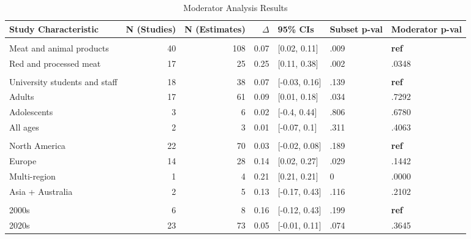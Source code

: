 \documentclass[sn-nature,referee,pdflatex]{sn-jnl}
\begin{document}
\begin{table}[!h]
\centering
\caption{\label{tab:table_two}Moderator Analysis Results}
\centering
\begin{tabular}[t]{lrrrlll}
\toprule
Study Characteristic & N (Studies) & N (Estimates) & $\Delta$ & 95\% CIs & Subset p-val & Moderator p-val\\
\midrule
\addlinespace[0.3em]
\multicolumn{7}{l}{\textbf{Outcome}}\\
\hspace{1em}Meat and animal products & 40 & 108 & 0.07 & {}[0.02, 0.11] & .009 & \textbf{ref}\\
\hspace{1em}Red and processed meat & 17 & 25 & 0.25 & {}[0.11, 0.38] & .002 & .0348\\
\addlinespace[0.3em]
\multicolumn{7}{l}{\textbf{Population}}\\
\hspace{1em}University students and staff & 18 & 38 & 0.07 & {}[-0.03, 0.16] & .139 & \textbf{ref}\\
\hspace{1em}Adults & 17 & 61 & 0.09 & {}[0.01, 0.18] & .034 & .7292\\
\hspace{1em}Adolescents & 3 & 6 & 0.02 & {}[-0.4, 0.44] & .806 & .6780\\
\hspace{1em}All ages & 2 & 3 & 0.01 & {}[-0.07, 0.1] & .311 & .4063\\
\addlinespace[0.3em]
\multicolumn{7}{l}{\textbf{Region}}\\
\hspace{1em}North America & 22 & 70 & 0.03 & {}[-0.02, 0.08] & .189 & \textbf{ref}\\
\hspace{1em}Europe & 14 & 28 & 0.14 & {}[0.02, 0.27] & .029 & .1442\\
\hspace{1em}Multi-region & 1 & 4 & 0.21 & {}[0.21, 0.21] & 0 & .0000\\
\hspace{1em}Asia + Australia & 2 & 5 & 0.13 & {}[-0.17, 0.43] & .116 & .2102\\
\addlinespace[0.3em]
\multicolumn{7}{l}{\textbf{Publication Decade}}\\
\hspace{1em}2000s & 6 & 8 & 0.16 & {}[-0.12, 0.43] & .199 & \textbf{ref}\\
\hspace{1em}2020s & 23 & 73 & 0.05 & {}[-0.01, 0.11] & .074 & .3645\\

\end{tabular}
\end{table}
\end{document}

